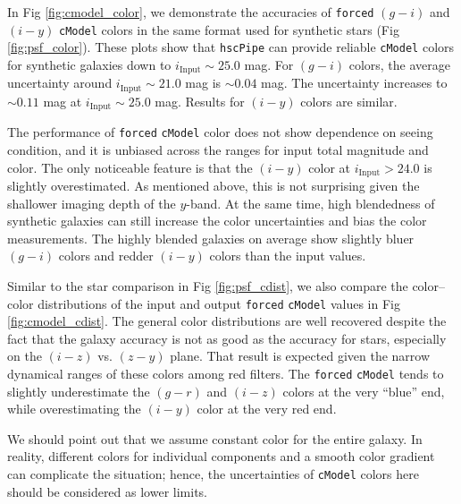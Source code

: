 \documentclass[useamsfonts]{pasj01}
\def\hscpipe{\texttt{hscPipe}}
\def\cmodel{\texttt{cModel}}
\def\forced{\texttt{forced}}
\begin{document}
    In Fig \ref{fig:cmodel_color}, we demonstrate the accuracies of \forced{} $(g-i)$
    and $(i-y)$ \cmodel{} colors in the same format used for synthetic stars
    (Fig \ref{fig:psf_color}).
    These plots show that \hscpipe{} can provide reliable \cmodel{} colors for
    synthetic galaxies down to $i_{\mathrm{Input}}{\sim}25.0$ mag.
    For $(g-i)$ colors, the average uncertainty around $i_{\mathrm{Input}}{\sim}21.0$ mag
    is ${\sim}0.04$ mag.
    The uncertainty increases to ${\sim}0.11$ mag at $i_{\mathrm{Input}}{\sim}25.0$ mag.
    Results for $(i-y)$ colors are similar.

    The performance of \forced{} \cmodel{} color does not show dependence on seeing
    condition, and it is unbiased across the ranges for input total magnitude and color.
    The only noticeable feature is that the $(i-y)$ color at
    $i_{\mathrm{Input}}>24.0$ is slightly overestimated.
    As mentioned above, this is not surprising given the shallower imaging depth of  the
    $y$-band.
    At the same time, high blendedness of synthetic galaxies can still increase the
   color uncertainties and bias the color measurements.
    The highly blended galaxies on average show slightly bluer  $(g-i)$ colors
     and redder  $(i-y)$ colors  than the input values.

    Similar to the star comparison in Fig \ref{fig:psf_cdist}, we also compare the color--color distributions
    of the input and output \forced{} \cmodel{} values in Fig \ref{fig:cmodel_cdist}.
    The general color distributions are well recovered despite the fact that the galaxy accuracy is
    not as good as the accuracy for stars, especially on the $(i-z)$ vs. $(z-y)$ plane.
    That result is expected given the narrow dynamical ranges of these colors among red filters.
    The \forced{} \cmodel{} tends to slightly underestimate the $(g-r)$ and $(i-z)$
    colors at the very ``blue'' end, while overestimating the $(i-y)$ color at the very
    red end.

   We should point out that we assume constant color for the entire galaxy.
    In reality, different colors for individual components and a smooth color gradient
    can complicate the situation; hence, the uncertainties of \cmodel{} colors
    here should be considered as lower limits.
\end{document}
